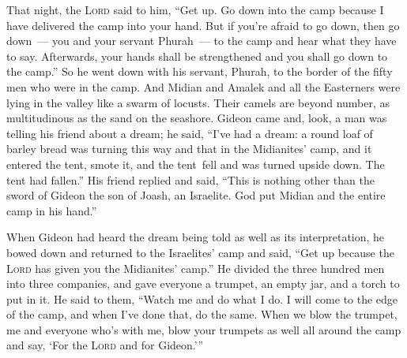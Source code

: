 \begin{inparaenum}
   That night, the \textsc{Lord} said to him, ``Get up. Go down into the camp because I have delivered the camp into your hand.%
   But if you're afraid to go down, then go down~--- you and your servant Phurah~--- to the camp%
   and hear what they have to say. Afterwards, your hands shall be strengthened and you shall go down to the camp.'' So he went down with his servant, Phurah, to the border of the fifty men who were in the camp.%
   And Midian and Amalek and all the Easterners were lying in the valley like a swarm of locusts. Their camels are beyond number, as multitudinous as the sand on the seashore.%
   Gideon came and, look, a man was telling his friend about a dream; he said, ``I've had a dream: a round loaf of barley bread was turning this way and that in the Midianites' camp, and it entered the tent, smote it, and the tent\understood\ fell and was turned upside down. The tent had fallen.''%
   His friend replied and said, ``This is nothing other than the sword of Gideon the son of Joash, an Israelite. God put Midian and the entire camp in his hand.''%
  
   When Gideon had heard the dream being told as well as its interpretation, he bowed down and returned to the Israelites' camp and said, ``Get up because the \textsc{Lord} has given you the Midianites' camp.''%
   He divided the three hundred men into three companies, and gave everyone a trumpet, an empty jar, and a torch to put in it.%
   He said to them, ``Watch me and do what I do. I will come to the edge of the camp, and when I've done that, do the same.%
   When we blow the trumpet, me and everyone who's with me, blow your trumpets as well all around the camp and say, `For the \textsc{Lord} and for Gideon.'\thinspace''%
  

\end{inparaenum}
